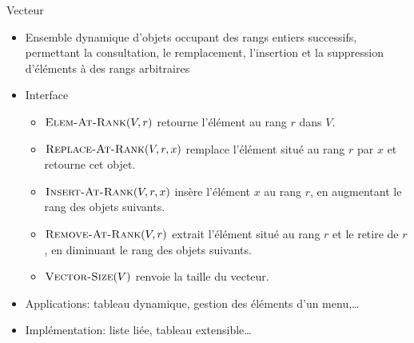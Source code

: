 \begin{frame}{Vecteur}

\begin{itemize}
\item Ensemble dynamique d'objets occupant des rangs entiers successifs, permettant la consultation, le remplacement, l'insertion et la suppression d'éléments à des rangs arbitraires
\item Interface
\begin{itemize}
\item $\textnormal{\scshape Elem-At-Rank}(V,r)$ retourne l'élément au rang $r$ dans $V$.
\item $\textnormal{\scshape Replace-At-Rank}(V,r,x)$ remplace l'élément situé au rang $r$ par $x$ et retourne cet objet. 
\item $\textnormal{\scshape Insert-At-Rank}(V,r,x)$ insère l'élément $x$ au rang $r$, en augmentant le rang des objets suivants.
\item $\textnormal{\scshape Remove-At-Rank}(V,r)$ extrait l'élément situé au rang $r$ et le retire de $r$, en diminuant le rang des objets suivants.
\item $\textnormal{\scshape Vector-Size}(V)$ renvoie la taille du vecteur.
\end{itemize}
\item Applications: tableau dynamique, gestion des éléments d'un menu,\ldots
\item Implémentation: liste liée, tableau extensible\ldots
\end{itemize}

\end{frame}

